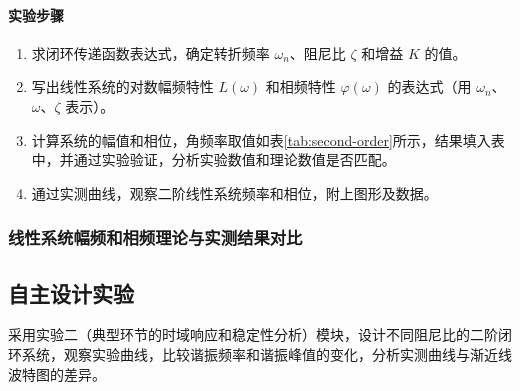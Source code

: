 \documentclass[12pt,a4paper]{article}
\begin{document}
\paragraph{实验步骤}
\begin{enumerate}
    \item 求闭环传递函数表达式，确定转折频率 $\omega_n$、阻尼比 $\zeta$ 和增益 $K$ 的值。
    \item 写出线性系统的对数幅频特性 $L(\omega)$ 和相频特性 $\varphi(\omega)$ 的表达式（用 $\omega_n$、$\omega$、$\zeta$ 表示）。
    \item 计算系统的幅值和相位，角频率取值如表\ref{tab:second-order}所示，结果填入表中，并通过实验验证，分析实验数值和理论数值是否匹配。
    \item 通过实测曲线，观察二阶线性系统频率和相位，附上图形及数据。
\end{enumerate}

\subsubsection{线性系统幅频和相频理论与实测结果对比}
\begin{table}[H]
\centering
\caption{线性系统幅频和相频理论与实测结果对比}
\label{tab:second-order}
\end{table}

\subsection{自主设计实验}
采用实验二（典型环节的时域响应和稳定性分析）模块，设计不同阻尼比的二阶闭环系统，观察实验曲线，比较谐振频率和谐振峰值的变化，分析实测曲线与渐近线波特图的差异。
\end{document}
